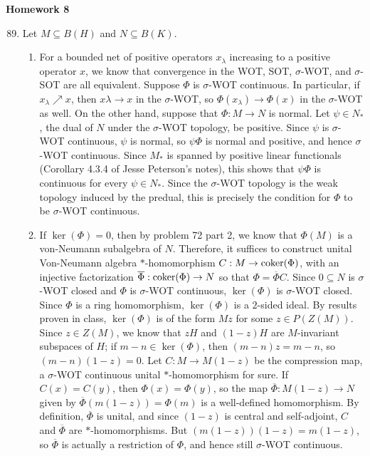 \documentclass[a4paper,10pt]{report}
\newcommand{\ol}[1]{\overline{#1}}
\begin{document}

\pagestyle{fancy}	
\fancyhf{} %
\setlength{\headheight}{60pt}

\begin{center}
	\textbf{Homework 8}
\end{center}

\begin{enumerate}
		\setcounter{enumi}{88}
	\item Let $M\subseteq B(H)$ and $N\subseteq B(K)$. 
		\begin{enumerate}
			\item For a bounded net of positive operators $x_\lambda$ increasing to a positive operator $x$, we know that convergence in the WOT, SOT, $\sigma$-WOT, and $\sigma$-SOT are all equivalent. Suppose $\Phi$ is $\sigma$-WOT continuous. In particular, if $x_\lambda\nearrow x$, then $x\lambda\to x$ in the $\sigma$-WOT, so $\Phi(x_\lambda)\to\Phi(x)$ in the $\sigma$-WOT as well. On the other hand, suppose that $\Phi:M\to N$ is normal. Let $\psi\in N_*$, the dual of $N$ under the $\sigma$-WOT topology, be positive. Since $\psi$ is $\sigma$-WOT continuous, $\psi$ is normal, so $\psi\Phi$ is normal and positive, and hence $\sigma$-WOT continuous. Since $M_*$ is spanned by positive linear functionals (Corollary 4.3.4 of Jesse Peterson's notes), %
				this shows that $\psi\Phi$ is continuous for every $\psi\in N_*$. Since the $\sigma$-WOT topology is the weak topology induced by the predual, this is precisely the condition for $\Phi$ to be $\sigma$-WOT continuous. 
			\item If $\ker(\Phi)=0$, then by problem 72 part 2, we know that $\Phi(M)$ is a von-Neumann subalgebra of $N$. Therefore, it suffices to construct  unital Von-Neumann algebra $*$-homomorphism $C:M\to\operatorname{coker}(\Phi)$, with an injective factorization $\ol{\Phi}:\coker(\Phi)\to N$ so that $\Phi=\ol{\Phi}C$. Since $0\subseteq N$ is $\sigma$-WOT closed and $\Phi$ is $\sigma$-WOT continuous, $\ker(\Phi)$ is $\sigma$-WOT closed. Since $\Phi$ is a ring homomorphism, $\ker(\Phi)$ is a $2$-sided ideal. By results proven in class, $\ker(\Phi)$ is of the form $Mz$ for some $z\in P(Z(M))$. Since $z\in Z(M)$, we know that $zH$ and $(1-z)H$ are $M$-invariant subspaces of $H$; if $m-n\in\ker(\Phi)$, then $(m-n)z=m-n$, so $(m-n)(1-z)=0$. Let $C:M\to M(1-z)$ be the compression map, a $\sigma$-WOT continuous unital $*$-homomorphism for sure. If $C(x)=C(y)$, then $\Phi(x)=\Phi(y)$, so the map $\ol{\Phi}:M(1-z)\to N$ given by $\ol{\Phi}(m(1-z))=\Phi(m)$ is a well-defined homomorphism. By definition, $\ol{\Phi}$ is unital, and since $(1-z)$ is central and self-adjoint, $C$ and $\ol{\Phi}$ are $*$-homomorphisms. But $(m(1-z))(1-z)=m(1-z)$, so $\ol{\Phi}$ is actually a restriction of $\Phi$, and hence still $\sigma$-WOT continuous. 


\end{enumerate}
\end{enumerate}
\end{document}
